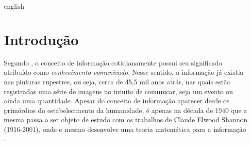 \documentclass[11pt,oneside,brazil,hidelinks,article,sumario=tradicional,a4paper]{abntex2}
\renewcommand{\imprimircapa}{%
  \begin{capa}%
    \centering
    {\imprimirinstituicao\vfill}

    {\ABNTEXchapterfont\large\imprimirautor}

    \vfill
    {\ABNTEXchapterfont\bfseries\LARGE\imprimirtitulo}
    \vfill

    \large\imprimirlocal

    \large\imprimirdata

    \vspace*{15mm}
  \end{capa}
}
\begin{document}
\pretextual
\imprimircapa

\begin{resumo} %
  \vspace{\onelineskip}

  \noindent
\end{resumo}
\newpage


\begin{resumo}[Abstract] %
  \begin{otherlanguage*}{english}
    \vspace{\onelineskip}

    \noindent
  \end{otherlanguage*}
\end{resumo}
\newpage






\textual%

\section{Introdução}\label{sec:intro}


Segundo \textcite{conceitoinformação}, o conceito de informação cotidianamente possui seu significado atribuído como \textit{conhecimento comunicado}. Nesse sentido, a informação já existia nas pinturas rupestres, ou seja, cerca de 45,5 mil anos atrás, nas quais estão registradas uma série de imagens no intuito de comunicar, seja um evento ou ainda uma quantidade. 
Apesar do conceito de informação aparecer desde os primórdios do estabelecimento da humanidade, é apenas na década de 1940 que a mesma passa a ser objeto de estudo com os trabalhos de Claude Elwood Shannon (1916-2001), onde o mesmo desenvolve uma teoria matemática para a informação \cite{CiênciaTransiçãoSeculosa} .
\end{document}
